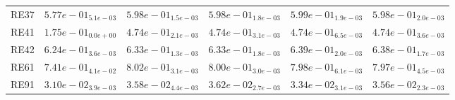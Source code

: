 \documentclass{article}
\begin{document}
\begin{table}
\begin{scriptsize}
\begin{tabular}{llllll}
RE37 & $  5.77e-01_{ 5.1e-03}$ & \cellcolor{gray25}$  5.98e-01_{ 1.5e-03}$ & $  5.98e-01_{ 1.8e-03}$ & \cellcolor{gray95}$  5.99e-01_{ 1.9e-03}$ & $  5.98e-01_{ 2.0e-03}$ \\
RE41 & $  1.75e-01_{ 0.0e+00}$ & \cellcolor{gray95}$  4.74e-01_{ 2.1e-03}$ & \cellcolor{gray25}$  4.74e-01_{ 3.1e-03}$ & $  4.74e-01_{ 6.5e-03}$ & $  4.74e-01_{ 3.6e-03}$ \\
RE42 & $  6.24e-01_{ 3.6e-03}$ & $  6.33e-01_{ 1.3e-03}$ & $  6.33e-01_{ 1.8e-03}$ & \cellcolor{gray95}$  6.39e-01_{ 2.0e-03}$ & \cellcolor{gray25}$  6.38e-01_{ 1.7e-03}$ \\
RE61 & $  7.41e-01_{ 4.1e-02}$ & \cellcolor{gray95}$  8.02e-01_{ 3.1e-03}$ & \cellcolor{gray25}$  8.00e-01_{ 3.0e-03}$ & $  7.98e-01_{ 6.1e-03}$ & $  7.97e-01_{ 4.5e-03}$ \\
RE91 & $  3.10e-02_{ 3.9e-03}$ & \cellcolor{gray25}$  3.58e-02_{ 4.4e-03}$ & \cellcolor{gray95}$  3.62e-02_{ 2.7e-03}$ & $  3.34e-02_{ 3.1e-03}$ & $  3.56e-02_{ 2.3e-03}$ \\
\hline
\end{tabular}
\end{scriptsize}
\end{table}
\end{document}

